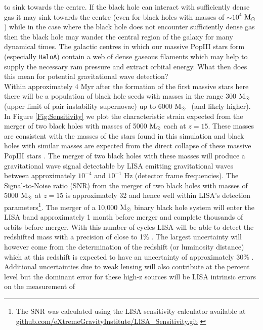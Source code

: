 \documentclass[graphics, twocolumn, usenatbib]{mn2e}
\newcommand{\msolar} {$\rm{M_{\odot}}~$}
\newcommand{\msolarc} {$\rm{M_{\odot}}$}
\newcommand{\hac} {\texttt{HaloA}}
\begin{document}
to sink towards the centre. If the black hole can interact with sufficiently dense gas it may
sink towards the centre (even for black holes with masses of $\sim 10^4$ \msolarc) while in
the case where the black hole does not encounter sufficiently dense gas then the black hole
may wander the central region of the galaxy for many dynamical times. The galactic centres
in which our massive PopIII
stars form (especially \hac) contain a web of dense gaseous filaments which may help to supply
the necessary ram pressure and extract orbital energy. 
What then does this mean for potential gravitational wave detection?\\
\indent Within approximately 4 Myr after the formation of the first massive stars here there
will be a population of black hole seeds with masses in the range 300 \msolar (upper limit of pair
instability supernovae) up to 6000 \msolar
(and likely higher). In Figure \ref{Fig:Sensitivity} we plot the characteristic strain
expected from the merger of two black holes with masses of 5000 \msolar each at $z = 15$.
These masses are consistent with the masses of the stars found in this simulation and black holes
with similar masses are expected from the direct collapse of these massive PopIII
stars \citep{Heger_2003}. The merger of two black holes with these masses will produce a
gravitational wave signal detectable by LISA \citep{eLISA, Sesana_2016, Cornish_2020} emitting
gravitational waves between approximately $10^{-4}$ and $10^{-1}$ Hz (detector frame frequencies). The
Signal-to-Noise ratio (SNR) from the merger of two black holes with masses of 5000 \msolar at $z = 15$
is approximately 32 and hence well within LISA's detection parameters\footnote{The SNR was calculated
  using the LISA sensitivity calculator available at
  \url{github.com/eXtremeGravityInstitute/LISA_Sensitivity.git} \citep{Robson_2019}}.
The merger of a 10,000 \msolar binary
black hole system will enter the LISA band approximately 1 month before merger and complete
thousands of orbits before merger. With this number of cycles LISA will be able to detect
the redshifted mass with a precision of close to 1\% \citep{Sesana_2013}. The largest uncertainty
will however come from the determination of the redshift (or luminosity distance) which at this
redshift is expected to have an uncertainty of approximately 30\% \citep{Sesana_2013}. Additional
uncertainties due to weak lensing will also contribute at the percent level
\citep{Shapiro_2010, Petiteau_2011}
but the dominant error for these high-z sources will be LISA intrinsic errors on the measurement of
\end{document}
